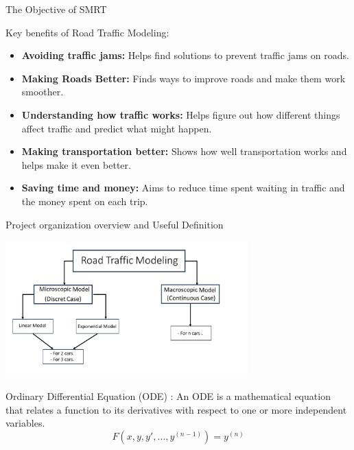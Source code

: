 \documentclass{beamer}
\begin{document}
\begin{frame}{The Objective of SMRT}
	\begin{block}{Key benefits of Road Traffic Modeling:}
		\begin{itemize}
	\item \textbf{Avoiding traffic jams:} Helps find solutions to prevent traffic jams on roads.
	\item \textbf{Making Roads Better:} Finds ways to improve roads and make them work smoother.
	\item \textbf{Understanding how traffic works:} Helps figure out how different things affect traffic and predict what might happen.
	\item \textbf{Making transportation better:} Shows how well transportation works and helps make it even better.
	\item \textbf{Saving time and money:} Aims to reduce time spent waiting in traffic and the money spent on each trip.
\end{itemize}
	\end{block}
\end{frame}

\begin{frame}{Project organization overview and Useful Definition}
	\begin{center}
    	\includegraphics[width=0.7\textwidth]{org1.png} 
    \end{center}
    \begin{block}{Ordinary Differential Equation (ODE) :}
    	An ODE is a mathematical equation that relates a function to its derivatives with respect to one or more independent variables.
    	\[
    	F\left(x,y,y',\ldots ,y^{(n-1)}\right)=y^{(n)}
    	\]
    \end{block}
\end{frame}
\end{document}
